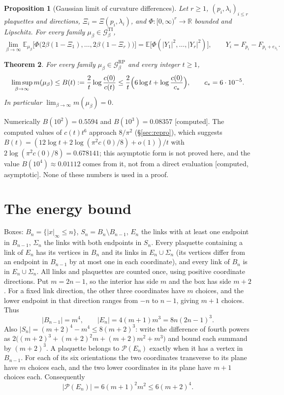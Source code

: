 \documentclass[11pt,a4paper]{article}
\theoremstyle{plain}
\newtheorem{theorem}{Theorem}[section]
\newtheorem{proposition}[theorem]{Proposition}
\theoremstyle{definition}
\theoremstyle{remark}
\numberwithin{equation}{section}
\newcommand{\R}{\mathbb{R}}
\newcommand{\E}{\mathbb{E}}
\newcommand{\st}[1]{\textsf{[#1]}}
\newcommand{\cP}{\mathcal{P}}
\newcommand{\cG}{\mathcal{G}}
\begin{document}
\begin{proposition}[Gaussian limit of curvature differences]\label{prop:Y}
Let $r\ge1$, $(p_i,\lambda_i)_{i\le r}$ plaquettes and directions, $\Xi_i=\Xi(p_i,\lambda_i)$, and $\Phi:[0,\infty)^r\to\R$ bounded and
Lipschitz. For every family $\mu_\beta\in\cG^{\mathrm{TI}}_\beta$,
\[
\lim_{\beta\to\infty}\E_{\mu_\beta}\bigl[\Phi\bigl(2\beta(1-\Xi_1),\dots,2\beta(1-\Xi_r)\bigr)\bigr]=\E\bigl[\Phi(|Y_1|^2,\dots,|Y_r|^2)\bigr],
\qquad Y_i=F_{p_i}-F_{p_i+e_{\lambda_i}}.
\]
\end{proposition}

\begin{theorem}\label{thm:A}
For every family $\mu_\beta\in\cG^{\mathrm{RP}}_\beta$ and every integer $t\ge1$,
\[
\limsup_{\beta\to\infty}m(\mu_\beta)\le B(t):=\frac2t\log\frac{c(0)}{c(t)}\le\frac2t\Bigl(6\log t+\log\frac{c(0)}{c_*}\Bigr),\qquad c_*=6\cdot10^{-5}.
\]
In particular $\lim_{\beta\to\infty}m(\mu_\beta)=0$.
\end{theorem}
Numerically $B(10^2)=0.5594$ and $B(10^3)=0.08357$ \st{computed}. The computed values of $c(t)t^6$ approach $8/\pi^2$ (\S\ref{sec:repro}),
which suggests $B(t)=(12\log t+2\log(\pi^2c(0)/8)+o(1))/t$ with $2\log(\pi^2c(0)/8)=0.678141$; this asymptotic form is not proved here,
and the value $B(10^4)\approx0.01112$ comes from it, not from a direct evaluation \st{computed, asymptotic}. None of these numbers is used
in a proof.

\section{The energy bound}\label{sec:L1}

Boxes: $B_n=\{|x|_\infty\le n\}$, $S_n=B_n\setminus B_{n-1}$, $E_n$ the links with at least one endpoint in $B_{n-1}$, $\Sigma_n$ the links
with both endpoints in $S_n$. Every plaquette containing a link of $E_n$ has its vertices in $B_n$ and its links in $E_n\cup\Sigma_n$ (its
vertices differ from an endpoint in $B_{n-1}$ by at most one in each coordinate), and every link of $B_n$ is in $E_n\cup\Sigma_n$.
All links and plaquettes are counted once, using positive coordinate directions. Put $m=2n-1$, so the interior has side $m$
and the box has side $m+2$. For a fixed link direction, the other three coordinates have $m$ choices, and the lower endpoint
in that direction ranges from $-n$ to $n-1$, giving $m+1$ choices. Thus
\[
|B_{n-1}|=m^4,\qquad |E_n|=4(m+1)m^3=8n(2n-1)^3.
\]
Also $|S_n|=(m+2)^4-m^4\le8(m+2)^3$: write the difference of fourth powers as
$2\bigl((m+2)^3+(m+2)^2m+(m+2)m^2+m^3\bigr)$ and bound each summand by $(m+2)^3$.
A plaquette belongs to $\cP(E_n)$ exactly when it has a vertex in $B_{n-1}$.
For each of its six orientations the two coordinates transverse to its plane have $m$ choices each, and the two lower
coordinates in its plane have $m+1$ choices each. Consequently
\[
|\cP(E_n)|=6(m+1)^2m^2\le6(m+2)^4.
\]
\end{document}

